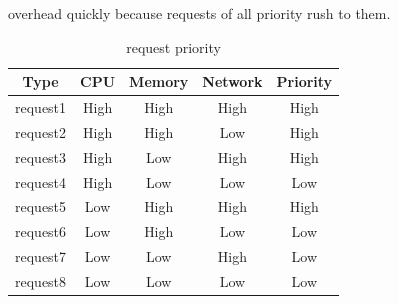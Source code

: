 \begin{enumerate}
       overhead quickly because requests of all priority rush to them.
       \hspace{0pt}
       \begin{table}[htbp]
        \begin{center}
         \begin{tabular}{c|c|c|c|c}
          \hline
          Type     & CPU  & Memory & Network & Priority \\ \hline
          request1 & High & High   & High    & High     \\ \hline
          request2 & High & High   & Low     & High     \\ \hline
          request3 & High & Low    & High    & High     \\ \hline
          request4 & High & Low    & Low     & Low      \\ \hline
          request5 & Low  & High   & High    & High     \\ \hline
          request6 & Low  & High   & Low     & Low      \\ \hline
          request7 & Low  & Low    & High    & Low      \\ \hline
          request8 & Low  & Low    & Low     & Low      \\ \hline
         \end{tabular}
        \end{center}
        \caption{request priority}
        \label{table:request_priority}
       \end{table}


\end{enumerate}
